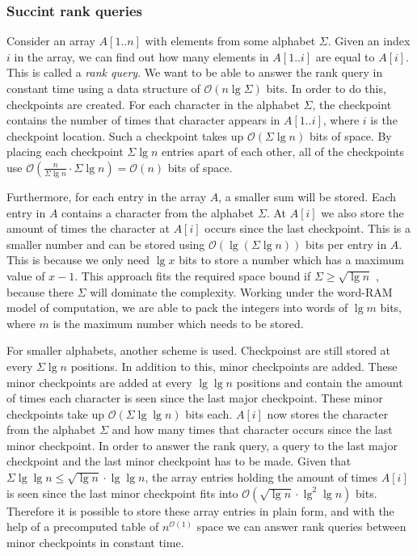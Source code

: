 \subsubsection{Succint rank queries}
Consider an array $A[1..n]$ with elements from some alphabet $\Sigma$. Given an index $i$ in the array, we can find out how many elements in $A[1..i]$ are equal to $A[i]$. This is called a \emph{rank query}. We want to be able to answer the rank query in constant time using a data structure of $\mathcal{O}(n \lg \Sigma)$ bits. In order to do this, checkpoints are created. For each character in the alphabet $\Sigma$, the checkpoint contains the number of times that character appears in $A[1..i]$, where $i$ is the checkpoint location. Such a checkpoint takes up $\mathcal{O}(\Sigma \lg n)$ bits of space. By placing each checkpoint $\Sigma \lg n$ entries apart of each other, all of the checkpoints use $\mathcal{O}(\frac{n}{\Sigma \lg n} \cdot \Sigma \lg n) = \mathcal{O}(n)$ bits of space.

Furthermore, for each entry in the array $A$, a smaller sum will be stored. Each entry in $A$ contains a character from the alphabet $\Sigma$. At $A[i]$ we also store the amount of times the character at $A[i]$ occurs since the last checkpoint. This is a smaller number and can be stored using $\mathcal{O}(\lg (\Sigma \lg n))$ bits per entry in $A$. This is because we only need $\lg x$ bits to store a number which has a maximum value of $x-1$. This approach fits the required space bound if $\Sigma \geq \sqrt{\lg n}$ , because there $\Sigma$ will dominate the complexity. Working under the word-RAM model of computation, we are able to pack the integers into words of $\lg m$ bits, where $m$ is the maximum number which needs to be stored.

For smaller alphabets, another scheme is used. Checkpoinst are still stored at every $\Sigma \lg n$ positions. In addition to this, minor checkpoints are added. These minor checkpoints are added at every $\lg \lg n$ positions and contain the amount of times each character is seen since the last major checkpoint. These minor checkpoints take up $\mathcal{O}(\Sigma \lg \lg n)$ bits each. $A[i]$ now stores the character from the alphabet $\Sigma$ and how many times that character occurs since the last minor checkpoint. In order to answer the rank query, a query to the last major checkpoint and the last minor checkpoint has to be made. Given that $\Sigma \lg \lg n \leq \sqrt{\lg n} \cdot \lg \lg n$, the array entries holding the amount of times $A[i]$ is seen since the last minor checkpoint fits into $\mathcal{O}(\sqrt{\lg n} \cdot \lg^2 \lg n)$ bits. Therefore it is possible to store these array entries in plain form, and with the help of a precomputed table of $n^{\mathcal{O}(1)}$ space we can answer rank queries between minor checkpoints in constant time.   

